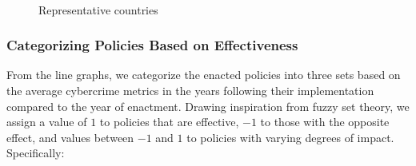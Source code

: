 \begin{figure}[htbp]
{        }\hfill
        \hfill
        \\
        \caption{Representative countries}\label{fig:representative-policy}
    \end{figure}

\subsubsection*{Categorizing Policies Based on Effectiveness} %
    From the line graphs, we categorize the enacted policies into three sets
    based on the average cybercrime metrics in the years following their implementation compared to the year of enactment.
    Drawing inspiration from fuzzy set theory,
    we assign a value of \(1\) to policies that are effective,
    \(-1\) to those with the opposite effect,
    and values between \(-1\) and \(1\) to policies with varying degrees of impact.
    Specifically:

